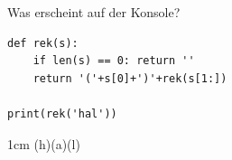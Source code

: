 \question[3]
Was erscheint auf der Konsole?
\begin{lstlisting}
def rek(s):
    if len(s) == 0: return ''
    return '('+s[0]+')'+rek(s[1:])

print(rek('hal'))
\end{lstlisting}
\begin{solutionbox}{1cm}
(h)(a)(l)
\end{solutionbox}
